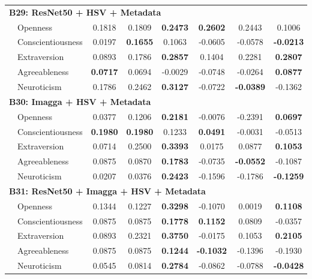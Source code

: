 \begin{longtable}{llcccccc}
\hline
\multicolumn{8}{l}{\textbf{B29: ResNet50 + HSV + Metadata}} \\
& Openness & 0.1818 & 0.1809 & \textbf{0.2473} & \textbf{0.2602} & 0.2443 & 0.1006 \\
& Conscientiousness & 0.0197 & \textbf{0.1655} & 0.1063 & -0.0605 & -0.0578 & \textbf{-0.0213} \\
& Extraversion & 0.0893 & 0.1786 & \textbf{0.2857} & 0.1404 & 0.2281 & \textbf{0.2807} \\
& Agreeableness & \textbf{0.0717} & 0.0694 & -0.0029 & -0.0748 & -0.0264 & \textbf{0.0877} \\
& Neuroticism & 0.1786 & 0.2462 & \textbf{0.3127} & -0.0722 & \textbf{-0.0389} & -0.1362 \\

\hline
\multicolumn{8}{l}{\textbf{B30: Imagga + HSV + Metadata}} \\
& Openness & 0.0377 & 0.1206 & \textbf{0.2181} & -0.0076 & -0.2391 & \textbf{0.0697} \\
& Conscientiousness & \textbf{0.1980} & \textbf{0.1980} & 0.1233 & \textbf{0.0491} & -0.0031 & -0.0513 \\
& Extraversion & 0.0714 & 0.2500 & \textbf{0.3393} & 0.0175 & 0.0877 & \textbf{0.1053} \\
& Agreeableness & 0.0875 & 0.0870 & \textbf{0.1783} & -0.0735 & \textbf{-0.0552} & -0.1087 \\
& Neuroticism & 0.0207 & 0.0376 & \textbf{0.2423} & -0.1596 & -0.1786 & \textbf{-0.1259} \\

\hline
\multicolumn{8}{l}{\textbf{B31: ResNet50 + Imagga + HSV + Metadata}} \\
& Openness & 0.1344 & 0.1227 & \textbf{0.3298} & -0.1070 & 0.0019 & \textbf{0.1108} \\
& Conscientiousness & 0.0875 & 0.0875 & \textbf{0.1778} & \textbf{0.1152} & 0.0809 & -0.0357 \\
& Extraversion & 0.0893 & 0.2321 & \textbf{0.3750} & -0.0175 & 0.1053 & \textbf{0.2105} \\
& Agreeableness & 0.0875 & 0.0875 & \textbf{0.1244} & \textbf{-0.1032} & -0.1396 & -0.1930 \\
& Neuroticism & 0.0545 & 0.0814 & \textbf{0.2784} & -0.0862 & -0.0788 & \textbf{-0.0428} \\

\end{longtable}


\small
\setlength{\tabcolsep}{4pt}

